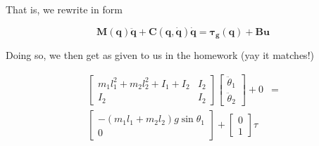 \documentclass[conference]{IEEEtran}
\begin{document}
That is, we rewrite in form

\begin{equation}
\bm{M(q) \ddot q + C (q, \dot q) \dot q = \tau_g (q) + B u}
\end{equation}

Doing so, we then get as given to us in the homework
(yay it matches!)

\begin{align}
    \begin{bmatrix}
        m_1 l_1 ^2 + m_2 l_2^2 + I_1 + I_2 & I_2 \\
        I_2 & I_2
    \end{bmatrix}
    \begin{bmatrix}
        \ddot \theta_1 \\
        \ddot \theta_2
    \end{bmatrix}
    + 0
    &= \nonumber \\
    \begin{bmatrix}
        - (m_1 l_1 + m_2 l_2) g \sin\theta_1 \\
        0
    \end{bmatrix}
     +
     \begin{bmatrix}
         0 \\
         1
     \end{bmatrix}
     \tau
\end{align}





\end{document}
